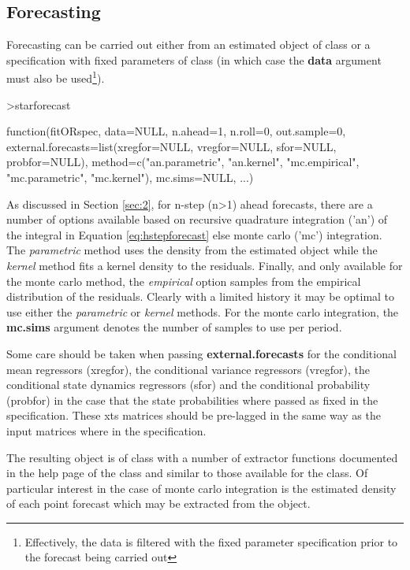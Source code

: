 \subsection{Forecasting}
Forecasting can be carried out either from an estimated object of class
 or a specification with fixed parameters of class
 (in which case the \textbf{data} argument must also be
used\footnote{Effectively, the data is filtered with the fixed parameter
specification prior to the forecast being carried out}).
\begin{Schunk}
\begin{Sinput}
>starforecast
\end{Sinput}
\begin{Soutput}
function(fitORspec, data=NULL, n.ahead=1, n.roll=0, out.sample=0, 
external.forecasts=list(xregfor=NULL, vregfor=NULL, sfor=NULL, 
probfor=NULL), method=c("an.parametric", "an.kernel", "mc.empirical", 
"mc.parametric", "mc.kernel"), mc.sims=NULL, ...) 
\end{Soutput}
\end{Schunk}
As discussed in Section \ref{sec:2}, for n-step (n>1) ahead forecasts,
there are a number of options available based on recursive quadrature
integration ('an') of the integral in Equation \ref{eq:hstepforecast} 
else monte carlo ('mc') integration. The \emph{parametric} method uses
the density from the estimated object while the \emph{kernel} method fits
a kernel density to the residuals. Finally, and only available for the monte
carlo method, the \emph{empirical} option samples from the empirical
distribution of the residuals. Clearly with a limited history it may be optimal
to use either the \emph{parametric} or \emph{kernel} methods. For the monte
carlo integration, the \textbf{mc.sims} argument denotes the number of samples
to use per period.

Some care should be taken when passing \textbf{external.forecasts} for the
conditional mean regressors (xregfor), the conditional variance regressors
(vregfor), the conditional state dynamics regressors (sfor) and the conditional
probability (probfor) in the case that the state probabilities where passed as
fixed in the specification. These xts matrices should be pre-lagged in the same
way as the input matrices where in the specification.

The resulting object is of class  with a number of extractor
functions documented in the help page of the class and similar to those
available for the  class. Of particular interest in the case of
monte carlo integration is the estimated density of each point forecast which
may be extracted from the object.

